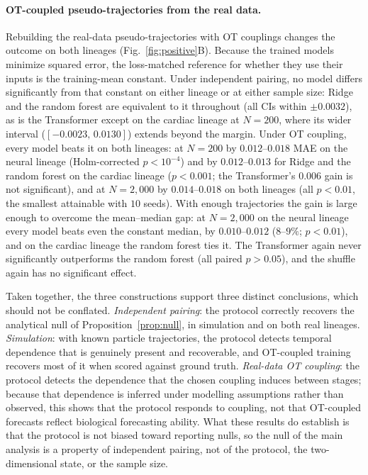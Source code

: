 \documentclass[pdflatex,sn-mathphys-num]{sn-jnl}
\theoremstyle{thmstyleone}%
\theoremstyle{thmstyletwo}%
\theoremstyle{thmstylethree}%
\begin{document}
\paragraph{OT-coupled pseudo-trajectories from the real data.} Rebuilding the real-data pseudo-trajectories with OT couplings changes the outcome on both lineages (Fig.~\ref{fig:positive}B). Because the trained models minimize squared error, the loss-matched reference for whether they use their inputs is the training-mean constant. Under independent pairing, no model differs significantly from that constant on either lineage or at either sample size: Ridge and the random forest are equivalent to it throughout (all CIs within $\pm0.0032$), as is the Transformer except on the cardiac lineage at $N=200$, where its wider interval ($[-0.0023,\,0.0130]$) extends beyond the margin. Under OT coupling, every model beats it on both lineages: at $N=200$ by $0.012$--$0.018$ MAE on the neural lineage (Holm-corrected $p<10^{-4}$) and by $0.012$--$0.013$ for Ridge and the random forest on the cardiac lineage ($p<0.001$; the Transformer's $0.006$ gain is not significant), and at $N=2{,}000$ by $0.014$--$0.018$ on both lineages (all $p<0.01$, the smallest attainable with $10$ seeds). With enough trajectories the gain is large enough to overcome the mean--median gap: at $N=2{,}000$ on the neural lineage every model beats even the constant median, by $0.010$--$0.012$ ($8$--$9\%$; $p<0.01$), and on the cardiac lineage the random forest ties it. The Transformer again never significantly outperforms the random forest (all paired $p>0.05$), and the shuffle again has no significant effect.

Taken together, the three constructions support three distinct conclusions, which should not be conflated. \emph{Independent pairing}: the protocol correctly recovers the analytical null of Proposition~\ref{prop:null}, in simulation and on both real lineages. \emph{Simulation}: with known particle trajectories, the protocol detects temporal dependence that is genuinely present and recoverable, and OT-coupled training recovers most of it when scored against ground truth. \emph{Real-data OT coupling}: the protocol detects the dependence that the chosen coupling induces between stages; because that dependence is inferred under modelling assumptions rather than observed, this shows that the protocol responds to coupling, not that OT-coupled forecasts reflect biological forecasting ability. What these results do establish is that the protocol is not biased toward reporting nulls, so the null of the main analysis is a property of independent pairing, not of the protocol, the two-dimensional state, or the sample size.
\end{document}

